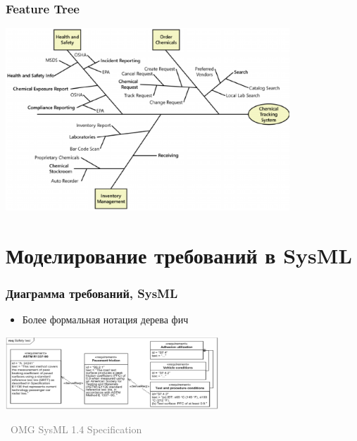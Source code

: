 \documentclass[xetex,mathserif,serif]{beamer}
\newcommand{\attribution}[1] {
    \vspace{-5mm}\begin{flushright}\begin{scriptsize}\textcolor{gray}{\textcopyright\, #1}\end{scriptsize}\end{flushright}
}
\begin{document}
    \begin{frame}
        \frametitle{Feature Tree}
        \begin{center}
            \includegraphics[width=0.8\textwidth]{featureTree.png}
        \end{center}
    \end{frame}

    \section{Моделирование требований в SysML}

    \begin{frame}
        \frametitle{Диаграмма требований, SysML}
        \begin{itemize}
            \item Более формальная нотация дерева фич
        \end{itemize}
        \begin{center}
            \includegraphics[width=0.6\textwidth]{sysMlRequirementDiagram.png}
            \attribution{OMG SysML 1.4 Specification}
        \end{center}
    \end{frame}
\end{document}
